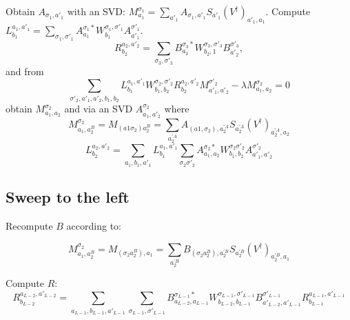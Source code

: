 \documentclass[showpacs,preprintnumbers,amsmath,amssymb,superscriptaddress,showkeys,pre]{revtex4}
\begin{document}
Obtain $A_{\sigma_1,a'_1}$ with an SVD: $M^{\sigma_1}_{a_1} = \sum_{a'_1} A_{\sigma_1,a'_1} S_{a'_1} (V^\dagger)_{a'_1,a_1}$.
Compute $L^{a_1,a'_1}_{b_1} = \sum_{\sigma_1,\sigma'_1} A^{\sigma_1 *}_{a_1} W^{\sigma_1,\sigma'_1}_{b_1} A^{\sigma'_1}_{a'_1}$.
\begin{equation}
R_{b_2}^{a_2,a'_2} =  \sum_{\sigma_3,\sigma'_3} B^{\sigma_3 *}_{a_2}
W^{\sigma_3,\sigma'_3}_{b_2,1} B^{\sigma'_3}_{a'_2},
\end{equation}
and from
\begin{equation}
\sum_{\sigma'_2,a'_1,a'_2,b_1,b_2} L^{a_1,a'_1}_{b_1} W^{\sigma_2,\sigma'_2}_{b_1,b_2} R_{b_2}^{a_2,a'_2} M^{\sigma'_2}_{a'_1,a'_2}
- \lambda M^{\sigma_2}_{a_1,a_2}=0
\end{equation}
obtain $M^{\sigma_2}_{a_1,a_2}$ and via an SVD $A^{\sigma_2}_{a_1,a'_2}$ where
 \begin{equation}
M^{\sigma_2}_{a_1,a^B_2}=M_{(a1\sigma_2)a^B_2}=\sum_{a^{'A}_2} A_{(a1,\sigma_2),a^{'A}_2} S_{a^{'A}_2}(V^\dagger)_{a^{'A}_2,a_2}
\end{equation}
\begin{equation}
L^{a_2,a'_2}_{b_2} = \sum_{a_1,b_1,a'_1} L^{a_1,a'_1}_{b_1} \sum_{\sigma_2\sigma'_2} A^{\sigma_2 *}_{a_1,a_2}
W^{\sigma_2\sigma'_2}_{b_1,b_2}A^{\sigma'_2}_{a'_1,a'_2}
\end{equation}

\subsection{Sweep to the left}

Recompute $B$ according to:

 \begin{equation}
M^{\sigma_2}_{a_1,a^B_2}=M_{(\sigma_2a^B_2),a_1}=\sum_{a^{'B}_2} B_{(\sigma_2a^B_2),a^{'B}_2} S_{a^{'B}_2}(V^\dagger)_{a^{'B}_2,a_1}
\end{equation}

Compute $R$:
\begin{equation}
R^{a_{L-2},a'_{L-2}}_{b_{L-2}} = \sum_{a_{L-1},b_{L-1},a'_{L-1}}\sum_{\sigma_{L-1},\sigma'_{L-1}} B^{\sigma_{L-1}*}_{a_{L-2},a_{L-1}}
W^{\sigma_{L-1},\sigma'_{L-1}}_{b_{L-2},b_{L-1}} B^{\sigma'_{L-1}}_{a'_{L-2},a'_{L-1}} R^{a_{L-1},a'_{L-1}}_{b_{L-1}}
\end{equation}
\end{document}
